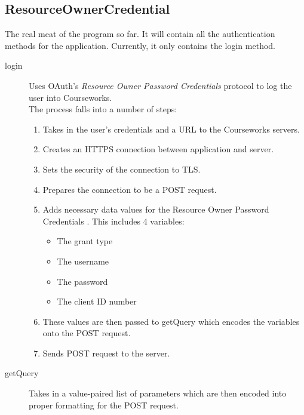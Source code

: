 \documentclass{article}
\begin{document}
\subsection{ResourceOwnerCredential}
The real meat of the program so far. It will contain all the authentication methods for 
the application. Currently, it only contains the login method.
\begin{description}
    \item[login]    Uses OAuth's \emph{Resource Owner Password Credentials} protocol to 
                    log the user into Courseworks. \\ The process falls into a number of 
                    steps:
    \begin{enumerate}
        \item       Takes in the user's credentials and a URL to the Courseworks servers.
        \item       Creates an HTTPS connection between application and server.
        \item       Sets the security of the connection to TLS.
        \item       Prepares the connection to be a POST request.
        \item       Adds necessary data values for the Resource Owner Password Credentials
                    . This includes 4 variables:
        \begin{itemize}
            \item   The grant type
            \item   The username
            \item   The password
            \item   The client ID number
        \end{itemize}
        \item       These values are then passed to getQuery which encodes the variables 
                    onto the POST request.
        \item       Sends POST request to the server.
    \end{enumerate}
    \item[getQuery] Takes in a value-paired list of parameters which are then encoded into
                    proper formatting for the POST request.
\end{description}

\end{document}
